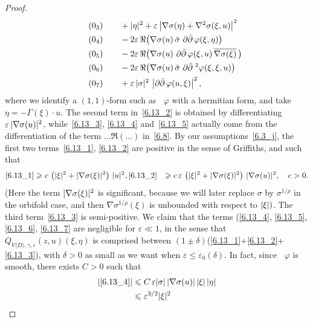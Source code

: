 \documentclass[AHL,Unicode,longabstracts,published]{cedram}
\DeclareMathOperator{\ddbar}{\partial\bar\partial}
\DeclarePairedDelimiter{\abs}{\lvert}{\rvert}
\let\leq\leqslant
\let\geq\geqslant
\begin{document}
\begin{proof}
\begin{align}
\tag{$\theequation_3$}\label{6.13_3}
&\qquad +\abs{\eta}^2+\varepsilon\,
\abs*{\nabla\sigma(\eta)+\nabla^2\sigma(\xi,u)}^2
\\
\tag{$\theequation_4$}\label{6.13_4}
&\qquad -2\varepsilon\,\Re\big(
\nabla\sigma(u)\,\bar\sigma\,\ddbar\varphi(\xi,\eta)\big)
\\
\tag{$\theequation_5$}\label{6.13_5}
&\qquad -2\varepsilon\,\Re\big(
\nabla\sigma(u)\,\ddbar\varphi(\xi,u)\,
\overline{\nabla\sigma(\xi)}\,\big)
\\
\tag{$\theequation_6$}\label{6.13_6}
&\qquad -2\varepsilon\,\Re\big(
\nabla\sigma(u)\,\bar\sigma\,\ddbar{\kern1pt}^2
\varphi(\xi,\xi,u)\big)
\\
\tag{$\theequation_7$}\label{6.13_7}
&\qquad +\varepsilon\,\abs{\sigma}^2\,\left|\ddbar\varphi(u,\xi)\right|^2,
\end{align}
where we identify a $(1,1)$-form such as $\ddbar\varphi$ with a hermitian form, and take $\eta=-\Gamma(\xi)\cdot u$. The second term in~\eqref{6.13_2} is obtained by differentiating
$\varepsilon\,\abs{\nabla\sigma(u)}^2$, while~\eqref{6.13_3}, \eqref{6.13_4} and~\eqref{6.13_5} actually come from the differentiation of the term $\dots\Re(\dots)$ in~\eqref{6.8}. By our assumptions~\eqref{6.3_j}, the first two terms~\eqref{6.13_1}, \eqref{6.13_2} are positive in the sense of Griffiths, and such that
\begin{align*}
\eqref{6.13_1}&\geq c\,\left(\abs{\xi}^2+\abs{\nabla\sigma(\xi)}^2\right)\,\abs{u}^2, \eqref{6.13_2}&\geq c\,\varepsilon\,\left(\abs{\xi}^2+\abs{\nabla\sigma(\xi)}^2\right)\,
\abs{\nabla\sigma(u)}^2,\quad c>0.
\end{align*}
(Here the term $\abs{\nabla\sigma(\xi)}^2$ is significant, because we will later replace $\sigma$ by $\sigma^{1/\rho}$ in the orbifold case, and then $\nabla\sigma^{1/\rho}(\xi)$ is unbounded with respect to $\abs{\xi})$. The third term~\eqref{6.13_3} is semi-positive. We claim that the terms (\ref{6.13_4}, \ref{6.13_5}, \ref{6.13_6}, \ref{6.13_7} are negligible for
$\varepsilon\ll 1$, in the sense that
$Q_{V\langle D\rangle,\gamma,\varepsilon}(z,u)(\xi,\eta)$ is comprised between $(1\pm\delta)$(\eqref{6.13_1}+\eqref{6.13_2}+\eqref{6.13_3}), with $\delta>0$ as small as we want when $\varepsilon\leq\varepsilon_0(\delta)$. In fact, since $\ddbar\varphi$ is smooth, there exists $C>0$ such that
\begin{align*}
\abs*{\eqref{6.13_4}} &\leq C\,\varepsilon\abs{\sigma}\,\abs{\nabla\sigma(u)}\,\abs{\xi}\,\abs{\eta}
\\
&\leq
\varepsilon^{3/2}\abs{\xi}^2

\end{align*}
\end{proof}
\end{document}
